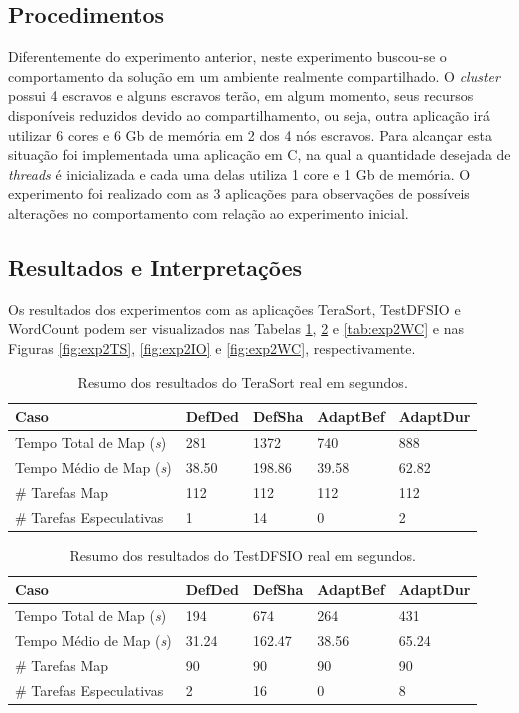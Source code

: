 \subsection{Procedimentos}
Diferentemente do experimento anterior, neste experimento buscou-se o comportamento da solução em um ambiente realmente compartilhado. O \textit{cluster} possui 4 escravos e alguns escravos terão, em algum momento, seus recursos disponíveis reduzidos devido ao compartilhamento, ou seja, outra aplicação irá utilizar 6 cores e 6 Gb de memória em 2 dos 4 nós escravos. Para alcançar esta situação foi implementada uma aplicação em C, na qual a quantidade desejada de \textit{threads} é inicializada e cada uma delas utiliza 1 core e 1 Gb de memória. O experimento foi realizado com as 3 aplicações para observações de possíveis alterações no comportamento com relação ao experimento inicial.

\subsection{Resultados e Interpretações}
Os resultados dos experimentos com as aplicações TeraSort, TestDFSIO e WordCount podem ser visualizados nas Tabelas \ref{tab:exp2TS}, \ref{tab:exp2IO} e \ref{tab:exp2WC} e nas Figuras \ref{fig:exp2TS}, \ref{fig:exp2IO} e \ref{fig:exp2WC}, respectivamente.

\begin{table}[h]
	\caption{Resumo dos resultados do TeraSort real em segundos.} \label{tab:exp2TS}
	\begin{tabular*}{\hsize}{l|llll}
		\textbf{Caso} & \textbf{DefDed} & \textbf{DefSha} & \textbf{AdaptBef} & \textbf{AdaptDur}\\
		\hline
		Tempo Total de Map ({\it{s}}) & 281 & 1372 & 740 & 888 \\
		Tempo Médio de Map ({\it{s}}) & 38.50 & 198.86 & 39.58 & 62.82 \\
		\# Tarefas Map & 112 & 112 & 112 & 112 \\
		\# Tarefas Especulativas & 1 & 14 & 0 & 2 \\
	\end{tabular*}
\end{table}

\begin{table}[ht]
	\caption{Resumo dos resultados do TestDFSIO real em segundos.} \label{tab:exp2IO}
	\begin{tabular*}{\hsize}{l|llll}
		\textbf{Caso} & \textbf{DefDed} & \textbf{DefSha} & \textbf{AdaptBef} & \textbf{AdaptDur}\\
		\hline
		Tempo Total de Map ({\it{s}}) & 194 & 674 & 264 & 431 \\
		Tempo Médio de Map ({\it{s}}) & 31.24 & 162.47 & 38.56 &  65.24 \\
		\# Tarefas Map & 90 & 90 & 90 & 90 \\
		\# Tarefas Especulativas & 2 & 16 & 0 & 8 \\
	\end{tabular*}
\end{table}


